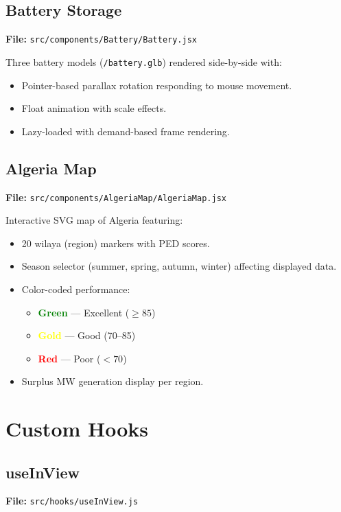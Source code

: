 \documentclass[12pt,a4paper]{article}
\begin{document}
\subsection{Battery Storage}
\textbf{File:} \texttt{src/components/Battery/Battery.jsx}

Three battery models (\texttt{/battery.glb}) rendered side-by-side with:
\begin{itemize}
    \item Pointer-based parallax rotation responding to mouse movement.
    \item Float animation with scale effects.
    \item Lazy-loaded with demand-based frame rendering.
\end{itemize}

\subsection{Algeria Map}
\textbf{File:} \texttt{src/components/AlgeriaMap/AlgeriaMap.jsx}

Interactive SVG map of Algeria featuring:
\begin{itemize}
    \item 20 wilaya (region) markers with PED scores.
    \item Season selector (summer, spring, autumn, winter) affecting displayed data.
    \item Color-coded performance:
    \begin{itemize}
        \item \textcolor{green}{\textbf{Green}} --- Excellent ($\geq 85$)
        \item \textcolor{yellow}{\textbf{Gold}} --- Good (70--85)
        \item \textcolor{red}{\textbf{Red}} --- Poor ($< 70$)
    \end{itemize}
    \item Surplus MW generation display per region.
\end{itemize}

\section{Custom Hooks}

\subsection{useInView}
\textbf{File:} \texttt{src/hooks/useInView.js}
\end{document}
